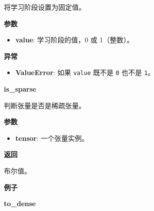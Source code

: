 将学习阶段设置为固定值。

\textbf{参数}

\begin{itemize}
\tightlist
\item
  \textbf{value}: 学习阶段的值，0 或 1（整数）。
\end{itemize}

\textbf{异常}

\begin{itemize}
\tightlist
\item
  \textbf{ValueError}: 如果 \texttt{value} 既不是 \texttt{0} 也不是
  \texttt{1}。
\end{itemize}


\textbf{is\_sparse}\label{isux5fsparse}

\begin{Shaded}
\begin{Highlighting}[]
\end{Highlighting}
\end{Shaded}

判断张量是否是稀疏张量。

\textbf{参数}

\begin{itemize}
\tightlist
\item
  \textbf{tensor}: 一个张量实例。
\end{itemize}

\textbf{返回}

布尔值。

\textbf{例子}

\begin{Shaded}
\begin{Highlighting}[]
\OperatorTok{>>>}    
\OperatorTok{>>>} \OperatorTok{=} \NormalTok{, }\OperatorTok{=}\NormalTok{)}
\OperatorTok{>>>} 
\OperatorTok{>>>} \OperatorTok{=} \NormalTok{, }\OperatorTok{=}\NormalTok{)}
\OperatorTok{>>>} 
\end{Highlighting}
\end{Shaded}


\textbf{to\_dense}\label{toux5fdense}

